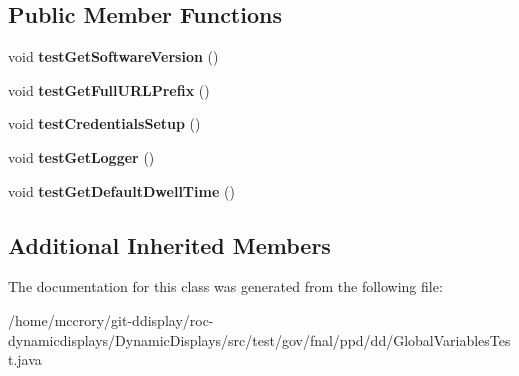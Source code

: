 \subsection*{Public Member Functions}
\begin{DoxyCompactItemize}
\item 
\hypertarget{classtest_1_1gov_1_1fnal_1_1ppd_1_1dd_1_1GlobalVariablesTest_a9d76ca535a3675f7691c271ec42a6661}{void {\bfseries test\-Get\-Software\-Version} ()}\label{classtest_1_1gov_1_1fnal_1_1ppd_1_1dd_1_1GlobalVariablesTest_a9d76ca535a3675f7691c271ec42a6661}

\item 
\hypertarget{classtest_1_1gov_1_1fnal_1_1ppd_1_1dd_1_1GlobalVariablesTest_a58e4e646a5b64a2e4416aa99a0e8e6f4}{void {\bfseries test\-Get\-Full\-U\-R\-L\-Prefix} ()}\label{classtest_1_1gov_1_1fnal_1_1ppd_1_1dd_1_1GlobalVariablesTest_a58e4e646a5b64a2e4416aa99a0e8e6f4}

\item 
\hypertarget{classtest_1_1gov_1_1fnal_1_1ppd_1_1dd_1_1GlobalVariablesTest_a4cc2ebdccd09fc82199a1619eb266526}{void {\bfseries test\-Credentials\-Setup} ()}\label{classtest_1_1gov_1_1fnal_1_1ppd_1_1dd_1_1GlobalVariablesTest_a4cc2ebdccd09fc82199a1619eb266526}

\item 
\hypertarget{classtest_1_1gov_1_1fnal_1_1ppd_1_1dd_1_1GlobalVariablesTest_aea79d292fb8176c765f6ec549ed37529}{void {\bfseries test\-Get\-Logger} ()}\label{classtest_1_1gov_1_1fnal_1_1ppd_1_1dd_1_1GlobalVariablesTest_aea79d292fb8176c765f6ec549ed37529}

\item 
\hypertarget{classtest_1_1gov_1_1fnal_1_1ppd_1_1dd_1_1GlobalVariablesTest_ae19faf852f1b8898c3c6914520550d12}{void {\bfseries test\-Get\-Default\-Dwell\-Time} ()}\label{classtest_1_1gov_1_1fnal_1_1ppd_1_1dd_1_1GlobalVariablesTest_ae19faf852f1b8898c3c6914520550d12}

\end{DoxyCompactItemize}
\subsection*{Additional Inherited Members}


The documentation for this class was generated from the following file\-:\begin{DoxyCompactItemize}
\item 
/home/mccrory/git-\/ddisplay/roc-\/dynamicdisplays/\-Dynamic\-Displays/src/test/gov/fnal/ppd/dd/Global\-Variables\-Test.\-java\end{DoxyCompactItemize}
